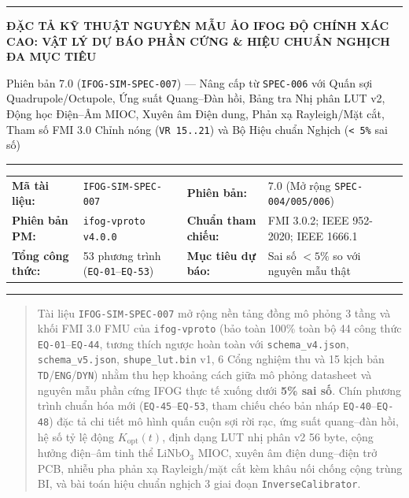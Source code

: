 \documentclass[11pt, a4paper]{article}
\begin{document}
\thispagestyle{plain}
{\color{primaryblue}\rule{\textwidth}{1.5pt}}
\vspace{0.3cm}

{\Large\bfseries\color{primaryblue} ĐẶC TẢ KỸ THUẬT NGUYÊN MẪU ẢO IFOG ĐỘ CHÍNH XÁC CAO: VẬT LÝ DỰ BÁO PHẦN CỨNG \& HIỆU CHUẨN NGHỊCH ĐA MỤC TIÊU}

\vspace{0.15cm}
{\normalsize\color{mutedgray} Phiên bản 7.0 (\texttt{IFOG-SIM-SPEC-007}) --- Nâng cấp từ \texttt{SPEC-006} với Quấn sợi Quadrupole/Octupole, Ứng suất Quang--Đàn hồi, Bảng tra Nhị phân LUT v2, Động học Điện--Âm MIOC, Xuyên âm Điện dung, Phản xạ Rayleigh/Mặt cắt, Tham số FMI 3.0 Chỉnh nóng (\texttt{VR 15..21}) và Bộ Hiệu chuẩn Nghịch (\texttt{< 5\%} sai số)}

\vspace{0.2cm}
{\color{rulegray}\rule{\textwidth}{0.6pt}}
\vspace{0.15cm}

\begin{tabular}{@{}l L{4.7cm} l L{5.1cm}@{}}
\textbf{Mã tài liệu:} & \texttt{IFOG-SIM-SPEC-007} & \textbf{Phiên bản:} & 7.0 (Mở rộng \texttt{SPEC-004/005/006}) \\
\textbf{Phiên bản PM:} & \texttt{ifog-vproto v4.0.0} & \textbf{Chuẩn tham chiếu:} & FMI 3.0.2; IEEE 952-2020; IEEE 1666.1 \\
\textbf{Tổng công thức:} & 53 phương trình (\texttt{EQ-01}--\texttt{EQ-53}) & \textbf{Mục tiêu dự báo:} & Sai số $< 5\%$ so với nguyên mẫu thật \\
\end{tabular}

\vspace{0.15cm}
{\color{primaryblue}\rule{\textwidth}{1.0pt}}
\vspace{0.25cm}

\begin{abstract}
\noindent Tài liệu \texttt{IFOG-SIM-SPEC-007} mở rộng nền tảng đồng mô phỏng 3 tầng và khối FMI 3.0 FMU của \texttt{ifog-vproto} (bảo toàn 100\% toàn bộ 44 công thức \texttt{EQ-01}--\texttt{EQ-44}, tương thích ngược hoàn toàn với \texttt{schema\_v4.json}, \texttt{schema\_v5.json}, \texttt{shupe\_lut.bin} v1, 6 Cổng nghiệm thu và 15 kịch bản \texttt{TD}/\texttt{ENG}/\texttt{DYN}) nhằm thu hẹp khoảng cách giữa mô phỏng datasheet và nguyên mẫu phần cứng IFOG thực tế xuống dưới \textbf{5\% sai số}. Chín phương trình chuẩn hóa mới (\texttt{EQ-45}--\texttt{EQ-53}, tham chiếu chéo bản nháp \texttt{EQ-40}--\texttt{EQ-48}) đặc tả chi tiết mô hình quấn cuộn sợi rời rạc, ứng suất quang--đàn hồi, hệ số tỷ lệ động $K_{\text{opt}}(t)$, định dạng LUT nhị phân v2 56 byte, cộng hưởng điện--âm tinh thể $\text{LiNbO}_3$ MIOC, xuyên âm điện dung--điện trở PCB, nhiễu pha phản xạ Rayleigh/mặt cắt kèm khâu nối chống cộng trùng BI, và bài toán hiệu chuẩn nghịch 3 giai đoạn \texttt{InverseCalibrator}.
\end{abstract}
\end{document}
